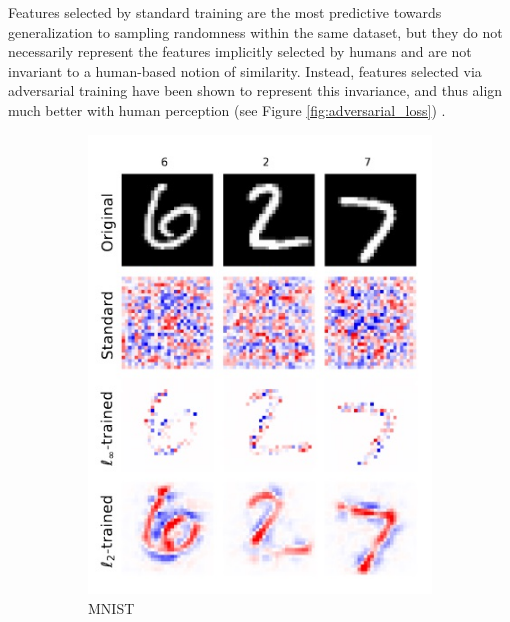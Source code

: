 Features selected by standard training
are the most predictive towards generalization
to sampling randomness within the same dataset, but they do
not necessarily represent the features implicitly selected 
by humans and are not invariant to a human-based notion 
of similarity. Instead, features selected via adversarial training 
have been shown to represent this
invariance, and thus align much better with 
human perception (see Figure \ref{fig:adversarial_loss})
\cite{ilyasAdversarialExamplesAre2019}. 

\begin{figure}[H]
    \centering
    \begin{subfigure}[b]{0.35\textwidth}
        \centering
        \includegraphics[width=\textwidth]{img/introduction/adversarial_loss_1.jpg}
        \caption{MNIST}
    \end{subfigure}
    \hspace{1cm}
    \begin{subfigure}[b]{0.35\textwidth}

\end{subfigure}
\end{figure}

